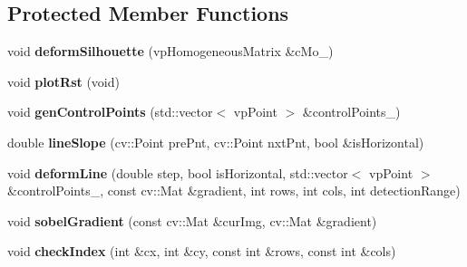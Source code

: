 \subsection*{\-Protected \-Member \-Functions}
\begin{DoxyCompactItemize}
\item 
\hypertarget{classactiveModelTracker_a69fe3d2a1c6283db47f6e65fc6ae625c}{void {\bfseries deform\-Silhouette} (vp\-Homogeneous\-Matrix \&c\-Mo\-\_\-)}\label{classactiveModelTracker_a69fe3d2a1c6283db47f6e65fc6ae625c}

\item 
\hypertarget{classactiveModelTracker_ada7393cf2fd78afc3dd2fb1c47e9428c}{void {\bfseries plot\-Rst} (void)}\label{classactiveModelTracker_ada7393cf2fd78afc3dd2fb1c47e9428c}

\item 
\hypertarget{classactiveModelTracker_ad6d058bec3f4a6563e634e6d6797668a}{void {\bfseries gen\-Control\-Points} (std\-::vector$<$ vp\-Point $>$ \&control\-Points\-\_\-)}\label{classactiveModelTracker_ad6d058bec3f4a6563e634e6d6797668a}

\item 
\hypertarget{classactiveModelTracker_a7dc04c3b2dd78c065e4de65ae53e4b0a}{double {\bfseries line\-Slope} (cv\-::\-Point pre\-Pnt, cv\-::\-Point nxt\-Pnt, bool \&is\-Horizontal)}\label{classactiveModelTracker_a7dc04c3b2dd78c065e4de65ae53e4b0a}

\item 
\hypertarget{classactiveModelTracker_a2f382eed6b3cf78be37775d33c4248e4}{void {\bfseries deform\-Line} (double step, bool is\-Horizontal, std\-::vector$<$ vp\-Point $>$ \&control\-Points\-\_\-, const cv\-::\-Mat \&gradient, int rows, int cols, int detection\-Range)}\label{classactiveModelTracker_a2f382eed6b3cf78be37775d33c4248e4}

\item 
\hypertarget{classactiveModelTracker_a81a958f0293c1ae7a37245e1d47997bd}{void {\bfseries sobel\-Gradient} (const cv\-::\-Mat \&cur\-Img, cv\-::\-Mat \&gradient)}\label{classactiveModelTracker_a81a958f0293c1ae7a37245e1d47997bd}

\item 
\hypertarget{classactiveModelTracker_a6911edd69d7bab2a6e25487fc663fd3f}{void {\bfseries check\-Index} (int \&cx, int \&cy, const int \&rows, const int \&cols)}\label{classactiveModelTracker_a6911edd69d7bab2a6e25487fc663fd3f}

\end{DoxyCompactItemize}


